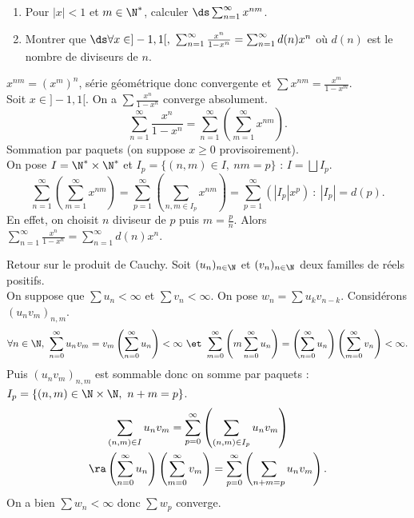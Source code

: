 \documentclass[11pt]{article}
\begin{document}
\begin{ex}{}{}
    \begin{enumerate}
        \item Pour $|x|<1$ et $m\in\N^*$, calculer $\ds\sum_{n=1}^\infty x^{nm}$.
        \item Montrer que $\ds\forall x \in ]-1,1[, ~ \sum_{n=1}^\infty\frac{x^n}{1-x^n}=\sum_{n=1}^\infty d(n)x^n$ où $d(n)$ est le nombre de diviseurs de $n$.
    \end{enumerate}
    \tcblower
     $x^{nm}=(x^m)^n$, série géométrique donc convergente et $\sum x^{nm}=\frac{x^m}{1-x^m}$.\\
     Soit $x\in]-1,1[$. On a $\sum\frac{x^n}{1-x^n}$ converge absolument.
    \begin{equation*}
        \sum_{n=1}^\infty\frac{x^n}{1-x^n} = \sum_{n=1}^{\infty}\left( \sum_{m=1}^\infty x^{nm} \right).
    \end{equation*}
    Sommation par paquets (on suppose $x\geq0$ provisoirement).\\
    On pose $I=\N^*\times\N^*$ et $I_p=\{(n,m)\in I, ~ nm = p\}$ : $I=\bigsqcup I_p$.
    \begin{equation*}
        \sum_{n=1}^\infty\left( \sum_{m=1}^\infty x^{nm}\right)=\sum_{p=1}^\infty\left( \sum_{n,m\in I_p} x^{nm} \right) = \sum_{p=1}^\infty\left( |I_p|x^p \right) ~:~ |I_p|=d(p).
    \end{equation*}
    En effet, on choisit $n$ diviseur de $p$ puis $m=\frac{p}{n}$. Alors $\sum_{n=1}^\infty\frac{x^n}{1-x^n}=\sum_{n=1}^\infty d(n)x^n$.
\end{ex}

\begin{prop}{Retour sur le produit de Cauchy.}{}
    Soit $(u_n)_{n\in\N}$ et $(v_n)_{n\in\N}$ deux familles de réels positifs.\\
    On suppose que $\sum u_n < \infty$ et $\sum v_n < \infty$. On pose $w_n=\sum u_kv_{n-k}$. Considérons $(u_nv_m)_{n,m}$.
    \begin{equation*}
        \forall n \in \N, ~ \sum_{n=0}^\infty u_nv_m = v_m\left( \sum_{n=0}^\infty u_n \right) < \infty ~\et~ \sum_{m=0}^\infty\left( m\sum_{n=0}^\infty u_n \right) = \left( \sum_{n=0}^\infty u_n \right)\left( \sum_{m=0}^\infty v_n \right) < \infty.
    \end{equation*}
    Puis $(u_nv_m)_{n,m}$ est sommable donc on somme par paquets : $I_p=\{(n,m)\in \N\times\N, ~ n+m=p\}$.
    \begin{align*}
        &\sum_{(n,m)\in I}u_nv_m = \sum_{p=0}^\infty\left( \sum_{(n,m)\in I_p} u_nv_m\right)\\
        \ra& \left( \sum_{n=0}^\infty u_n \right)\left( \sum_{m=0}^\infty v_m \right) = \sum_{p=0}^\infty\left( \sum_{n+m=p} u_nv_m \right).
    \end{align*}
    On a bien $\sum w_n<\infty$ donc $\sum w_p$ converge.
\end{prop}
\end{document}
